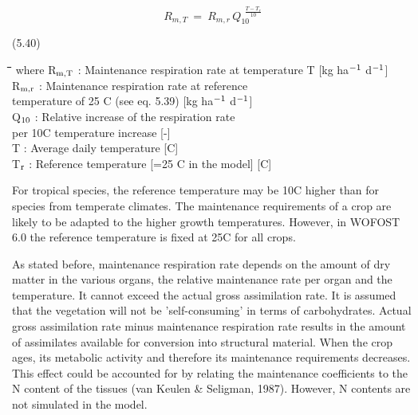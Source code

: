 \begin{displaymath}
R _{m,T} ~=~ R _{m,r} \, Q _{10}^{~~{\frac{T-T _{r} }{10}} }
\end{displaymath}

 
\strut\hfill (5.40)\\
\strut\hfill 
\nwln
\begin{tabbing}
\hspace{1.27cm}\=\hspace{1.27cm}\=\hspace{1.27cm}\=\hspace{1.27cm}\=%
\hspace{1.27cm}\=\hspace{1.27cm}\=\hspace{1.27cm}\=\hspace{1.27cm}\=%
\hspace{1.27cm}\=\hspace{1.27cm}\=\kill
where R$_{{\rm m,T}}$ : Maintenance respiration rate at temperature T        [kg ha$^{{\rm -1}}$ d$^{{\rm -1}}$]\\
R$_{{\rm m,r}}$ : Maintenance respiration rate at reference \\
   temperature of 25 \degrees C (see eq. 5.39)        [kg ha$^{{\rm -1}}$ d$^{{\rm -1}}$]\\
Q$_{{\rm 10}}$ : Relative increase of the respiration rate\\
   per 10\degrees C temperature increase        [-]\\
T : Average daily temperature         [\degrees C]\\
T$_{{\rm r}}$ : Reference temperature {\small [=25 \degrees C in the model]}        [\degrees C]
\end{tabbing}

 
For tropical species, the reference temperature may be 10\degrees C higher than for species from
temperate climates. The maintenance requirements of a crop are likely to be adapted to
the higher growth temperatures. However, in WOFOST 6.0 the reference temperature is
fixed at 25\degrees C for all crops.



As stated before, maintenance respiration rate depends on the amount of dry matter in the
various organs, the relative maintenance rate per organ and the temperature. It cannot
exceed the actual gross assimilation rate. It is assumed that the vegetation will not be
'self-consuming' in terms of carbohydrates. Actual gross assimilation rate minus mainten\-ance respiration rate results in the amount of assimilates available for conversion into
structural material. When the crop ages, its metabolic activity and therefore its mainten\-ance require\-ments decreases. This effect could be accounted for by relating the mainten\-ance coefficients to the N content of the tissues (van Keulen \& Seligman, 1987).
However, N contents are not simulated in the model. 




